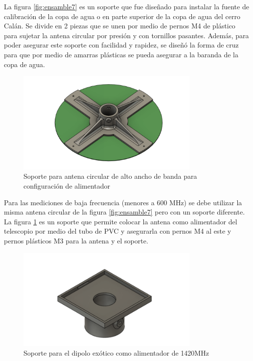 La figura \ref{fig:ensamble7} es un soporte que fue diseñado para instalar la fuente de calibración de la copa de agua o  en parte superior de la copa de agua del cerro Calán. Se divide en 2 piezas que se unen por medio de pernos M4 de plástico para sujetar la antena circular por presión y con tornillos pasantes. Además, para poder asegurar este soporte con facilidad y rapidez, se diseñó la forma de cruz para que por medio de amarras plásticas se pueda asegurar a la baranda de la copa de agua.\\

\begin{figure}
    \centering
    \includegraphics[width=0.8\textwidth]{img/soporte3D2}
    \caption{Soporte para antena circular de alto ancho de banda para configuración de alimentador}
    \label{fig:ensamble8}
\end{figure}

Para las mediciones de baja frecuencia (menores a 600 MHz) se debe utilizar la misma antena circular de la figura \ref{fig:ensamble7} pero con un soporte diferente. La figura \ref{fig:ensamble8} es un soporte que permite colocar la antena como alimentador del telescopio por medio del tubo de PVC y asegurarla con pernos M4 al este y pernos plásticos M3 para la antena y el soporte.\\

\begin{figure}
    \centering
    \includegraphics[width=0.8\textwidth]{img/soporte3D6}
    \caption{Soporte para el dipolo exótico como alimentador de 1420MHz}
    \label{fig:ensamble9}
\end{figure}

